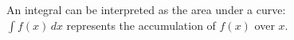 \documentclass[preview]{standalone}
\begin{document}
\begin{center}
An integral can be interpreted as the area under a curve:\\$\int f(x)\,dx$ represents the accumulation of $f(x)$ over $x$.
\end{center}
\end{document}
